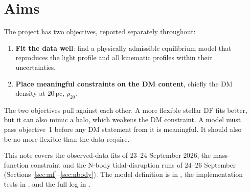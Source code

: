 \documentclass[11pt,a4paper]{article}
\newcommand{\Msun}{\ensuremath{\mathrm{M}_\odot}\xspace}
\newcommand{\pc}{\ensuremath{\,\mathrm{pc}}\xspace}
\begin{document}
\begin{abstract}
profile is recovered to a few per cent over 2--40\pc. The data therefore
determine the mass profile but not yet the stellar/DM split. An external
stellar mass from the oMEGACat present-day mass function (MIST isochrones)
gives 8.3--9.8\,\Msun of luminous mass per counted $F625W<19$ star in the
kinematically relevant zones, 12--27 per cent below the dynamical 10.67.
Reported as a function of this mass per star, the halo switches on below
the dynamical value ($\rho_{20}=2.6$ at 9.0, 4.3 at 8.0); mocks show that a
16 per cent underestimate produces exactly such a halo on a no-DM truth, so
the photometric budget must reach $\sim3$ per cent before it can decide.
With the stellar mass pinned the residual degeneracy is remnants against a
compact halo, at the 1 per cent level of the enclosed mass. Finally, N-body
realizations of a no-DM and a DM model (equilibrium verified in isolation)
were disrupted on $\omega$ Cen's orbit for 1.96\,Gyr in a static Milky Way.
Their tails differ by at most $\sim30$ per cent in the observable
quantities (tail-to-cluster star ratio, near-tail dispersion); the
mismatches with the observed tails are common to both models and point to
the orbit, integration time and missing rotation rather than to DM.
\end{abstract}

\tableofcontents

\section{Aims}
\label{sec:aims}

The project has two objectives, reported separately throughout:
\begin{enumerate}
\item \textbf{Fit the data well}: find a physically admissible equilibrium
  model that reproduces the light profile and all kinematic profiles within
  their uncertainties.
\item \textbf{Place meaningful constraints on the DM content}, chiefly the
  DM density at 20\pc, $\rho_{20}$.
\end{enumerate}
The two objectives pull against each other. A more flexible stellar DF fits
better, but it can also mimic a halo, which weakens the DM constraint. A
model must pass objective~1 before any DM statement from it is meaningful. It
should also be no more flexible than the data require.

This note covers the observed-data fits of 23--24 September 2026, the
mass-function constraint and the N-body tidal-disruption runs of 24--26
September (Sections~\ref{sec:mf}--\ref{sec:nbody}). The model
definition is in , the implementation
tests in , and the full log in
.
\end{document}
